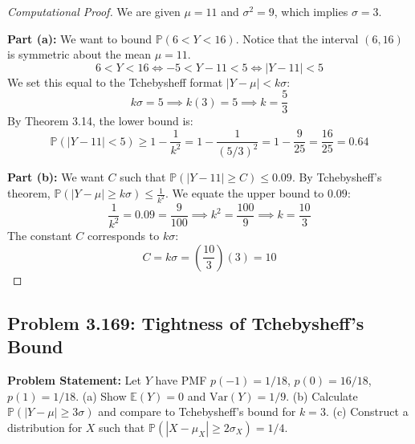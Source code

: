 \documentclass[11pt, a4paper]{article}
\theoremstyle{definition}
\theoremstyle{remark}
\newcommand{\E}{\mathbb{E}}
\newcommand{\Var}{\mathrm{Var}}
\newcommand{\Prob}{\mathbb{P}}
\begin{document}
\begin{proof}[Computational Proof]
We are given $\mu = 11$ and $\sigma^2 = 9$, which implies $\sigma = 3$.

\textbf{Part (a):} We want to bound $\Prob(6 < Y < 16)$.
Notice that the interval $(6, 16)$ is symmetric about the mean $\mu = 11$.
\[ 6 < Y < 16 \iff -5 < Y - 11 < 5 \iff |Y - 11| < 5 \]
We set this equal to the Tchebysheff format $|Y - \mu| < k\sigma$:
\[ k\sigma = 5 \implies k(3) = 5 \implies k = \frac{5}{3} \]
By Theorem 3.14, the lower bound is:
\[ \Prob(|Y - 11| < 5) \ge 1 - \frac{1}{k^2} = 1 - \frac{1}{(5/3)^2} = 1 - \frac{9}{25} = \frac{16}{25} = 0.64 \]

\textbf{Part (b):} We want $C$ such that $\Prob(|Y - 11| \ge C) \le 0.09$.
By Tchebysheff's theorem, $\Prob(|Y - \mu| \ge k\sigma) \le \frac{1}{k^2}$.
We equate the upper bound to $0.09$:
\[ \frac{1}{k^2} = 0.09 = \frac{9}{100} \implies k^2 = \frac{100}{9} \implies k = \frac{10}{3} \]
The constant $C$ corresponds to $k\sigma$:
\[ C = k\sigma = \left(\frac{10}{3}\right)(3) = 10 \]
\end{proof}

\subsection{Problem 3.169: Tightness of Tchebysheff's Bound}
\textbf{Problem Statement:} Let $Y$ have PMF $p(-1) = 1/18$, $p(0) = 16/18$, $p(1) = 1/18$.
(a) Show $\E(Y) = 0$ and $\Var(Y) = 1/9$.
(b) Calculate $\Prob(|Y - \mu| \ge 3\sigma)$ and compare to Tchebysheff's bound for $k=3$.
(c) Construct a distribution for $X$ such that $\Prob(|X - \mu_X| \ge 2\sigma_X) = 1/4$.
\end{document}

